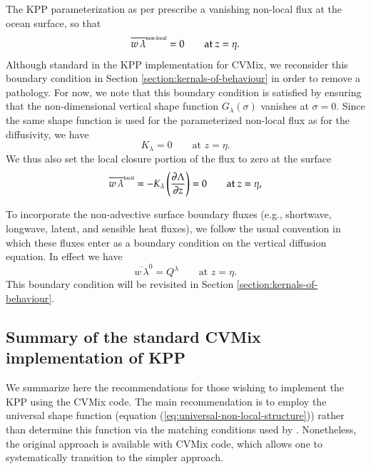 The KPP parameterization as per \cite{LargeKPP} prescribe a vanishing
non-local flux at the ocean surface, so that
\begin{equation}
  \overline{w \, \lambda}^{\mbox{\tiny non-local}} = 0 \qquad \mbox{at $z=\eta$}.
\label{eq:non-local-surface-bc}
\end{equation}
Although standard in the KPP implementation for CVMix, we reconsider
this boundary condition in Section \ref{section:kernals-of-behaviour}
in order to remove a pathology.  For now, we note that this boundary
condition is satisfied by ensuring that the non-dimensional vertical
shape function $G_{\lambda}(\sigma)$ vanishes at $\sigma = 0$.  Since
the same shape function is used for the parameterized non-local flux
as for the diffusivity, we have
\begin{equation}
   K_{\lambda}  = 0   \qquad \mbox{at $z=\eta$}.
\end{equation}
We thus also set the local closure portion of the flux to zero at the
surface
\begin{equation}
\overline{w \, \lambda}^{\mbox{\tiny local}} = -K_{\lambda} \left( \frac{\partial \Lambda}{\partial z} \right) = 
 0  \qquad \mbox{at $z=\eta$},
\label{eq:no-flux-local}
\end{equation}

To incorporate the non-advective surface boundary fluxes (e.g.,
shortwave, longwave, latent, and sensible heat fluxes), we follow the
usual convention in which these fluxes enter as a boundary condition
on the vertical diffusion equation.  In effect we have
\begin{equation}
\overline{w \, \lambda}^{0}  = Q^{\lambda}  \qquad \mbox{at $z=\eta$}. 
\label{eq:surface-boundary-flux}
\end{equation} 
This boundary condition will be revisited in Section
\ref{section:kernals-of-behaviour}.


\subsection{Summary of the standard CVMix implementation of KPP}
\label{subsection:recommended-choices}

We summarize here the recommendations for those wishing to implement
the KPP using the CVMix code.  The main recommendation is to employ
the universal shape function (equation
(\ref{eq:universal-non-local-structure})) rather than determine this
function via the matching conditions used by \cite{LargeKPP}.
Nonetheless, the original approach is available with CVMix code, which
allows one to systematically transition to the simpler approach.


